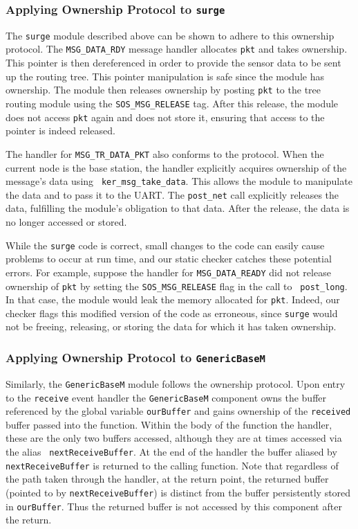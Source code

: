 \subsubsection{Applying Ownership Protocol to {\tt surge}}

The {\tt surge} module described above can be shown to adhere to this
ownership protocol.  The {\tt MSG\_DATA\_RDY} message handler
allocates {\tt pkt} and takes ownership. This pointer is then
dereferenced in order to provide the sensor data to be sent up the
routing tree.  This pointer manipulation is safe since the module has
ownership.  The module then releases ownership by posting {\tt pkt} to
the tree routing module using the {\tt SOS\_MSG\_RELEASE} tag.  After
this release, the module does not access {\tt pkt} again and does not
store it, ensuring that access to the pointer is indeed released. 

The handler for {\tt MSG\_TR\_DATA\_PKT} also conforms to the
protocol.   When the current node is the base station, the handler
explicitly acquires ownership of the message's data using {\tt
ker\_msg\_take\_data}.  This allows the module to manipulate the data
and to pass it to the UART.  The {\tt post\_net} call explicitly
releases the data, fulfilling the module's obligation to that data.
After the release, the data is no longer accessed or stored.

While the {\tt surge} code is correct, small changes to the code can
easily cause problems to occur at run time, and our static checker
catches these potential errors.  For example, suppose the handler for
{\tt MSG\_DATA\_READY} did not release ownership of {\tt pkt} by
setting the {\tt SOS\_MSG\_RELEASE} flag in the call to {\tt
post\_long}.  In that case, the module would leak the memory allocated
for {\tt pkt}.  Indeed, our checker flags this modified version of the
code as erroneous, since {\tt surge} would not be freeing, releasing,
or storing the data for which it has taken ownership.


\subsubsection{Applying Ownership Protocol to {\tt GenericBaseM}}

Similarly, the {\tt GenericBaseM} module follows the
ownership protocol. Upon entry to the {\tt receive}
event handler the {\tt GenericBaseM} component owns the buffer
referenced by the global variable {\tt ourBuffer} and gains ownership
of the {\tt received} buffer passed into the function.  Within the
body of the function the handler, these are the only two buffers
accessed, although they are at times accessed via the alias {\tt
nextReceiveBuffer}.  At the end of the handler the buffer aliased by
{\tt nextReceiveBuffer} is returned to the calling function.  Note
that regardless of the path taken through the handler, at the 
return point, the returned buffer (pointed to by {\tt nextReceiveBuffer})
is distinct from the buffer persistently
stored in {\tt ourBuffer}.  Thus the returned buffer is not accessed
by this component after the return.



